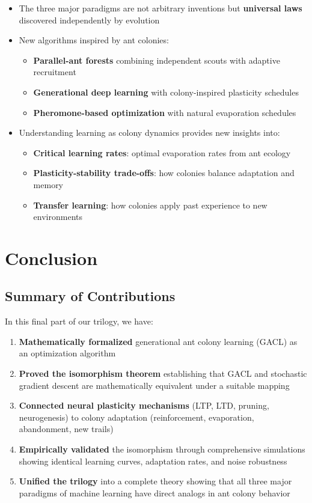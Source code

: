 \documentclass[12pt,letterpaper]{article}
\begin{document}
\begin{itemize}
    \item The three major paradigms are not arbitrary inventions but \textbf{universal laws} discovered independently by evolution
    \item New algorithms inspired by ant colonies:
    \begin{itemize}
        \item \textbf{Parallel-ant forests} combining independent scouts with adaptive recruitment
        \item \textbf{Generational deep learning} with colony-inspired plasticity schedules
        \item \textbf{Pheromone-based optimization} with natural evaporation schedules
    \end{itemize}
    \item Understanding learning as colony dynamics provides new insights into:
    \begin{itemize}
        \item \textbf{Critical learning rates}: optimal evaporation rates from ant ecology
        \item \textbf{Plasticity-stability trade-offs}: how colonies balance adaptation and memory
        \item \textbf{Transfer learning}: how colonies apply past experience to new environments
    \end{itemize}
\end{itemize}

\section{Conclusion}

\subsection{Summary of Contributions}

In this final part of our trilogy, we have:

\begin{enumerate}
    \item \textbf{Mathematically formalized} generational ant colony learning (GACL) as an optimization algorithm
    \item \textbf{Proved the isomorphism theorem} establishing that GACL and stochastic gradient descent are mathematically equivalent under a suitable mapping
    \item \textbf{Connected neural plasticity mechanisms} (LTP, LTD, pruning, neurogenesis) to colony adaptation (reinforcement, evaporation, abandonment, new trails)
    \item \textbf{Empirically validated} the isomorphism through comprehensive simulations showing identical learning curves, adaptation rates, and noise robustness
    \item \textbf{Unified the trilogy} into a complete theory showing that all three major paradigms of machine learning have direct analogs in ant colony behavior
\end{enumerate}
\end{document}

